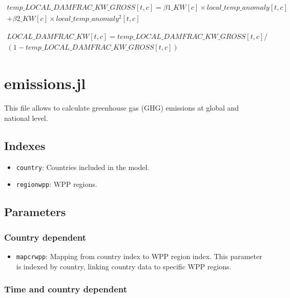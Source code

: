 \documentclass[
]{article}
\providecommand{\tightlist}{%
  \setlength{\itemsep}{0pt}\setlength{\parskip}{0pt}}
\begin{document}
\begin{multline}
 temp\_LOCAL\_DAMFRAC\_KW\_GROSS[t,c] = \beta1\_KW[c] \times local\_temp\_anomaly[t,c] \\
 + \beta2\_KW[c] \times local\_temp\_anomaly^2[t,c]
\end{multline}

\begin{multline}
 LOCAL\_DAMFRAC\_KW[t,c] = temp\_LOCAL\_DAMFRAC\_KW\_GROSS[t,c] / \\(1-temp\_LOCAL\_DAMFRAC\_KW\_GROSS[t,c])
\end{multline}

\section{emissions.jl}\label{emissions.jl}

This file allows to calculate greenhouse gas (GHG) emissions at global
and national level.

\subsection{Indexes}\label{indexes-2}

\begin{itemize}
\tightlist
\item
  \texttt{country}: Countries included in the model.
\item
  \texttt{regionwpp}: WPP regions.
\end{itemize}

\subsection{Parameters}\label{parameters-2}

\subsubsection{Country dependent}\label{country-dependent}

\begin{itemize}
\tightlist
\item
  \texttt{mapcrwpp}: Mapping from country index to WPP region index.
  This parameter is indexed by country, linking country data to specific WPP regions.
\end{itemize}

\subsubsection{Time and country
dependent}\label{time-and-country-dependent-4}
\end{document}
